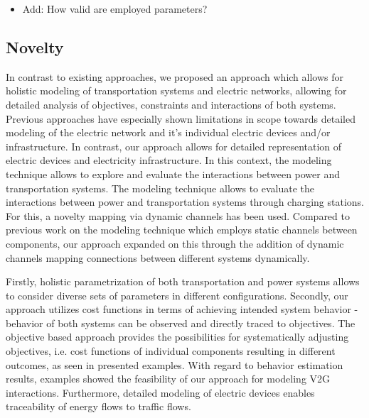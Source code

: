 \begin{itemize}
	\item Add: How valid are employed parameters?
\end{itemize}

\subsection{Novelty}

In contrast to existing approaches, we proposed an approach which allows for holistic modeling of transportation systems and electric networks, allowing for detailed analysis of objectives, constraints and interactions of both systems. Previous approaches have especially shown limitations in scope towards detailed modeling of the electric network and it's individual electric devices and/or infrastructure. In contrast, our approach allows for detailed representation of electric devices and electricity infrastructure. 
In this context, the modeling technique allows to explore and evaluate the interactions between power and transportation systems. 
The modeling technique allows to evaluate the interactions between power and transportation systems through charging stations. For this, a novelty mapping via dynamic channels has been used. Compared to previous work on the modeling technique which employs static channels between components, our approach expanded on this through the addition of dynamic channels mapping connections between different systems dynamically.

Firstly, holistic parametrization of both transportation and power systems allows to consider diverse sets of parameters in different configurations. Secondly, our approach utilizes cost functions in terms of achieving intended system behavior - behavior of both systems can be observed and directly traced to objectives. The objective based approach provides the possibilities for systematically adjusting objectives, i.e. cost functions of individual components resulting in different outcomes, as seen in presented examples. With regard to behavior estimation results, examples showed the feasibility of our approach for modeling V2G interactions. Furthermore, detailed modeling of electric devices enables traceability of energy flows to traffic flows.

